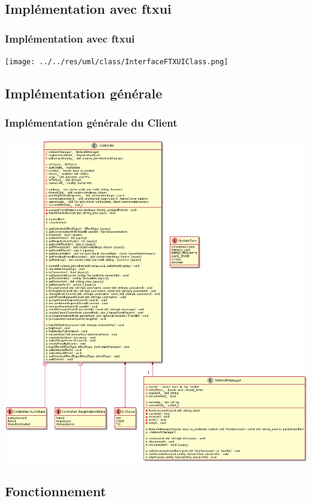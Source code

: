 \documentclass{beamer}
\begin{document}
\subsection{Implémentation avec ftxui}
\begin{frame}
\frametitle{Implémentation avec ftxui}

\texttt{[image: ../../res/uml/class/InterfaceFTXUIClass.png]}
\end{frame}

\subsection{Implémentation générale}
\begin{frame}
\frametitle{Implémentation générale du Client}

\includegraphics[width=1\textwidth]{../../res/uml/class/ClientStructureClass.png}
\end{frame}

\subsection{Fonctionnement}
\end{document}
